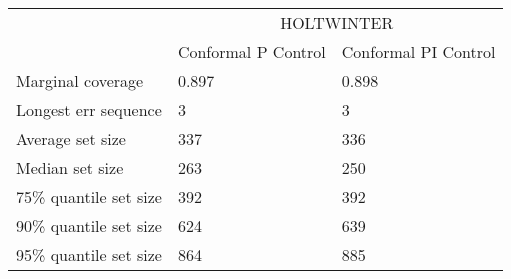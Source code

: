\begin{tabular}{lll}
\toprule
& \multicolumn{2}{c}{HOLTWINTER} \\
& Conformal P Control & Conformal PI Control \\
\midrule
Marginal coverage & 0.897 & 0.898 \\
Longest err sequence & 3 & 3 \\
Average set size & 337 & 336 \\
Median set size & 263 & 250 \\
75\% quantile set size & 392 & 392 \\
90\% quantile set size & 624 & 639 \\
95\% quantile set size & 864 & 885 \\
\bottomrule
\end{tabular}
